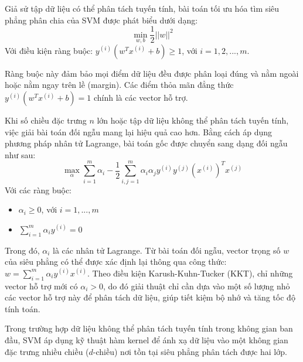 Giả sử tập dữ liệu có thể phân tách tuyến tính, bài toán tối ưu hóa tìm siêu phẳng phân chia của SVM được phát biểu dưới dạng:
\begin{equation}
\min_{w,b}\frac{1}{2}||w||^{2}
\end{equation}
Với điều kiện ràng buộc: $y^{(i)}(w^{T}x^{(i)}+b)\ge1$, với $i=1,2,...,m$.

Ràng buộc này đảm bảo mọi điểm dữ liệu đều được phân loại đúng và nằm ngoài hoặc nằm ngay trên lề (margin). Các điểm thỏa mãn đẳng thức $y^{(i)}(w^{T}x^{(i)}+b)=1$ chính là các vector hỗ trợ.

Khi số chiều đặc trưng $n$ lớn hoặc tập dữ liệu không thể phân tách tuyến tính, việc giải bài toán đối ngẫu mang lại hiệu quả cao hơn. Bằng cách áp dụng phương pháp nhân tử Lagrange, bài toán gốc được chuyển sang dạng đối ngẫu như sau:
\begin{equation}
\max_{\alpha}\sum_{i=1}^{m}\alpha_{i}-\frac{1}{2}\sum_{i,j=1}^{m}\alpha_{i}\alpha_{j}y^{(i)}y^{(j)}(x^{(i)})^{T}x^{(j)}
\end{equation}
Với các ràng buộc: 
\begin{itemize}
    \item $\alpha_{i}\ge0$, với $i=1,...,m$
    \item $\sum_{i=1}^{m}\alpha_{i}y^{(i)}=0$
\end{itemize}

Trong đó, $\alpha_i$ là các nhân tử Lagrange. Từ bài toán đối ngẫu, vector trọng số $w$ của siêu phẳng có thể được xác định lại thông qua công thức: $w=\sum_{i=1}^{m}\alpha_{i}y^{(i)}x^{(i)}$. Theo điều kiện Karush-Kuhn-Tucker (KKT), chỉ những vector hỗ trợ mới có $\alpha_i > 0$, do đó giải thuật chỉ cần dựa vào một số lượng nhỏ các vector hỗ trợ này để phân tách dữ liệu, giúp tiết kiệm bộ nhớ và tăng tốc độ tính toán.

Trong trường hợp dữ liệu không thể phân tách tuyến tính trong không gian ban đầu, SVM áp dụng kỹ thuật hàm kernel để ánh xạ dữ liệu vào một không gian đặc trưng nhiều chiều ($d$-chiều) nơi tồn tại siêu phẳng phân tách được hai lớp. 

